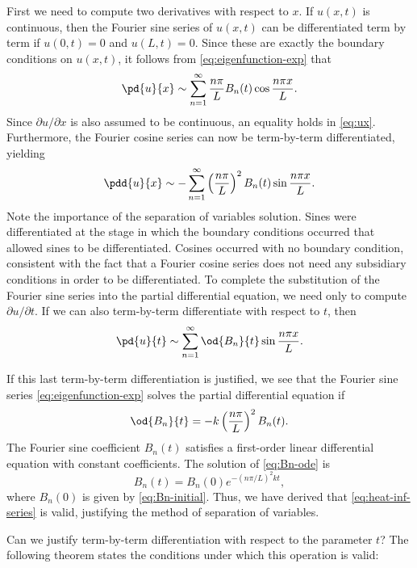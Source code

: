 First we need to compute two derivatives with respect to $x$.  If $u(x,t)$ is continuous, then the Fourier sine series of $u(x,t)$ can be differentiated term by term if $u(0,t) = 0$ and $u(L,t) = 0$.  Since these are exactly the boundary conditions on $u(x,t)$, it follows from \eqref{eq:eigenfunction-exp} that
\begin{equation}
\label{eq:ux}
\pd{u}{x} \sim \sum_{n=1}^{\infty} \frac{n\pi}{L} B_n(t) \cos \frac{n\pi x}{L}.
\end{equation}
Since $\partial u/\partial x$ is also assumed to be continuous, an equality holds in \eqref{eq:ux}.  Furthermore, the Fourier cosine series can now be term-by-term differentiated, yielding
\begin{equation}
\label{eq:uxx}
\pdd{u}{x} \sim -\sum_{n=1}^{\infty} \left(\frac{n\pi}{L}\right)^2 B_n(t) \sin \frac{n\pi x}{L}.
\end{equation}
Note the importance of the separation of variables solution.  Sines were differentiated at the stage in which the boundary conditions occurred that allowed sines to be differentiated.  Cosines occurred with no boundary condition, consistent with the fact that a Fourier cosine series does not need any subsidiary conditions in order to be differentiated.  To complete the substitution of the Fourier sine series into the partial differential equation, we need only to compute $\partial u/\partial t$.  If we can also term-by-term differentiate with respect to $t$, then
\begin{equation}
\label{eq:ut}
\pd{u}{t} \sim \sum_{n=1}^{\infty} \od{B_n}{t} \sin \frac{n\pi x}{L}.
\end{equation}

If this last term-by-term differentiation is justified, we see that the Fourier sine series \eqref{eq:eigenfunction-exp} solves the partial differential equation if
\begin{equation}
\label{eq:Bn-ode}
\od{B_n}{t} = -k\left(\frac{n\pi}{L}\right)^2 B_n(t).
\end{equation}
The Fourier sine coefficient $B_n(t)$ satisfies a first-order linear differential equation with constant coefficients.  The solution of \eqref{eq:Bn-ode} is
\[
B_n(t) = B_n(0) e^{-(n\pi/L)^2 kt},
\]
where $B_n(0)$ is given by \eqref{eq:Bn-initial}.  Thus, we have derived that \eqref{eq:heat-inf-series} is valid, justifying the method of separation of variables.

Can we justify term-by-term differentiation with respect to the parameter $t$?  The following theorem states the conditions under which this operation is valid:

